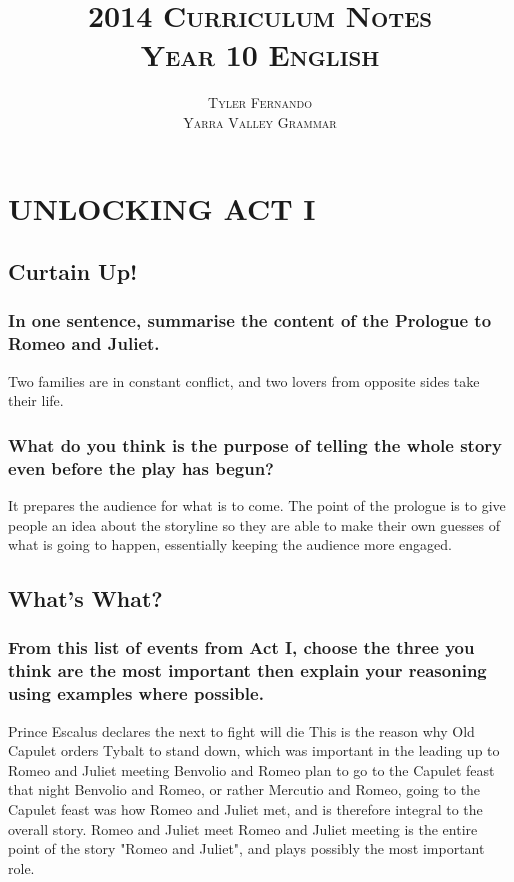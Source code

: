 \documentclass{article}
\title{\LARGE \scshape{2014 Curriculum Notes} \\ \Huge \scshape{Year 10 English}}
\author{\Large \scshape{Tyler Fernando} \\ \small \scshape{Yarra Valley Grammar}}
\date{}
\begin{document}
\maketitle

\tableofcontents

\cleardoublepage

\section{UNLOCKING ACT I}
\subsection{Curtain Up!}
\subsubsection{In one sentence, summarise the content of the Prologue to Romeo and Juliet.}
Two families are in constant conflict, and two lovers from opposite sides take their life.
\subsubsection{What do you think is the purpose of telling the whole story even before the play has begun?}
It prepares the audience for what is to come. The point of the prologue is to give people an idea about the storyline so they are able to make their own guesses of what is going to happen, essentially keeping the audience more engaged.
\subsection{What's What?}
\subsubsection{From this list of events from Act I, choose the three you think are the most important then explain your reasoning using examples where possible.}
\begin{outline}
\1 Prince Escalus declares the next to fight will die
\2 This is the reason why Old Capulet orders Tybalt to stand down, which was important in the leading up to Romeo and Juliet meeting
\1 Benvolio and Romeo plan to go to the Capulet feast that night
\2 Benvolio and Romeo, or rather Mercutio and Romeo, going to the Capulet feast was how Romeo and Juliet met, and is therefore integral to the overall story.
\1 Romeo and Juliet meet
\2 Romeo and Juliet meeting is the entire point of the story "Romeo and Juliet", and plays possibly the most important role.
\end{outline}
\end{document}
